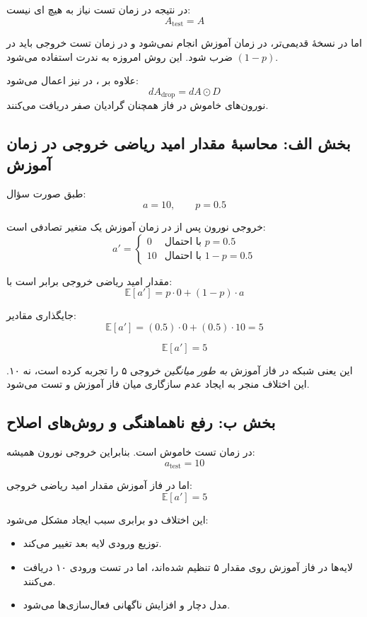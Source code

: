 \documentclass{article}
\begin{document}
در نتیجه در زمان تست نیاز به هیچ ‌ای نیست:
\[
A_{\text{test}} = A
\]

اما در نسخهٔ قدیمی‌تر، در زمان آموزش  انجام نمی‌شود و در زمان تست خروجی باید در $(1-p)$ ضرب شود. این روش امروزه به ندرت استفاده می‌شود.

 علاوه بر ، در  نیز اعمال می‌شود:
\[
dA_{\text{drop}} = dA \odot D
\]
نورون‌های خاموش در فاز  همچنان گرادیان صفر دریافت می‌کنند.


\subsection{بخش الف: محاسبهٔ مقدار امید ریاضی خروجی در زمان آموزش}

طبق صورت سؤال:
\[
a = 10, \qquad p = 0.5
\]

خروجی نورون پس از  در زمان آموزش یک متغیر تصادفی است:
\[
a' =
\begin{cases}
	0 & \text{با احتمال } p = 0.5 \\
	10 & \text{با احتمال } 1-p = 0.5
\end{cases}
\]

مقدار امید ریاضی خروجی برابر است با:
\[
\mathbb{E}[a'] = p \cdot 0 + (1-p)\cdot a
\]

جایگذاری مقادیر:
\[
\mathbb{E}[a'] = (0.5)\cdot 0 + (0.5)\cdot 10 = 5
\]

\[
\boxed{\mathbb{E}[a'] = 5}
\]

این یعنی شبکه در فاز آموزش \emph{به طور میانگین} خروجی ۵ را تجربه کرده است، نه ۱۰. این اختلاف منجر به ایجاد عدم سازگاری میان فاز آموزش و تست می‌شود.


\subsection{بخش ب: رفع ناهماهنگی  و روش‌های اصلاح}

در زمان تست  خاموش است. بنابراین خروجی نورون همیشه:
\[
a_{\text{test}} = 10
\]

اما در فاز آموزش مقدار امید ریاضی خروجی:
\[
\mathbb{E}[a'] = 5
\]

این اختلاف دو برابری سبب ایجاد مشکل \textbf{} می‌شود:
\begin{itemize}
	\item توزیع ورودی لایه بعد تغییر می‌کند.
	\item لایه‌ها در فاز آموزش روی مقدار ۵ تنظیم شده‌اند، اما در تست ورودی ۱۰ دریافت می‌کنند.
	\item مدل دچار  و افزایش ناگهانی فعال‌سازی‌ها می‌شود.
\end{itemize}
\end{document}
